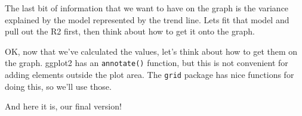 \documentclass[]{book}
\newenvironment{Shaded}{\begin{snugshade}}{\end{snugshade}}
\newcommand{\KeywordTok}[1]{\textcolor[rgb]{0.13,0.29,0.53}{\textbf{#1}}}
\newcommand{\DataTypeTok}[1]{\textcolor[rgb]{0.13,0.29,0.53}{#1}}
\newcommand{\DecValTok}[1]{\textcolor[rgb]{0.00,0.00,0.81}{#1}}
\newcommand{\StringTok}[1]{\textcolor[rgb]{0.31,0.60,0.02}{#1}}
\newcommand{\OperatorTok}[1]{\textcolor[rgb]{0.81,0.36,0.00}{\textbf{#1}}}
\newcommand{\NormalTok}[1]{#1}
\begin{document}
The last bit of information that we want to have on the graph is the
variance explained by the model represented by the trend line. Lets fit
that model and pull out the R2 first, then think about how to get it
onto the graph.

\begin{Shaded}
\end{Shaded}

OK, now that we've calculated the values, let's think about how to get
them on the graph. ggplot2 has an \texttt{annotate()} function, but this
is not convenient for adding elements outside the plot area. The
\texttt{grid} package has nice functions for doing this, so we'll use
those.

And here it is, our final version!
\end{document}
